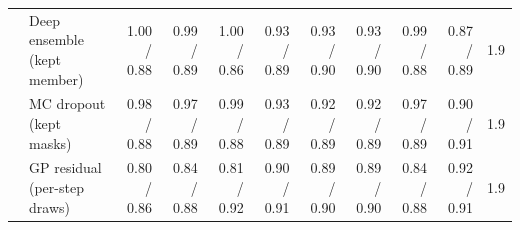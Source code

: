 \begin{longtable}{llrrrrrrrrr}
 & Deep ensemble (kept member) & 1.00 / 0.88 & 0.99 / 0.89 & 1.00 / 0.86 & 0.93 / 0.89 & 0.93 / 0.90 & 0.93 / 0.90 & 0.99 / 0.88 & 0.87 / 0.89 & 1.9 \\
 & MC dropout (kept masks) & 0.98 / 0.88 & 0.97 / 0.89 & 0.99 / 0.88 & 0.93 / 0.89 & 0.92 / 0.89 & 0.92 / 0.89 & 0.97 / 0.89 & 0.90 / 0.91 & 1.9 \\
 & GP residual (per-step draws) & 0.80 / 0.86 & 0.84 / 0.88 & 0.81 / 0.92 & 0.90 / 0.91 & 0.89 / 0.90 & 0.89 / 0.90 & 0.84 / 0.88 & 0.92 / 0.91 & 1.9 \\
\end{longtable}
\endgroup
